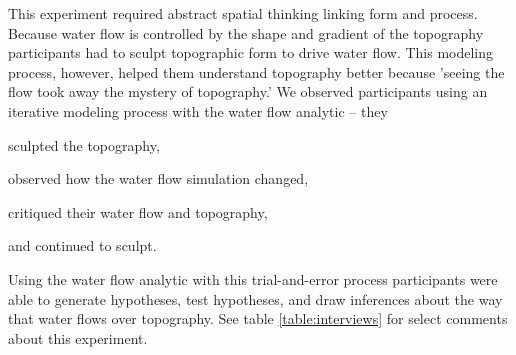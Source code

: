 \documentclass[prodmode,acmtochi]{acmsmall} %
\begin{document}
This experiment required abstract spatial thinking linking form and process. 
Because water flow is controlled by the shape and gradient of the topography
participants had to sculpt topographic form to drive water flow. 
This modeling process, however, helped them understand topography better 
because 'seeing the flow took away the mystery of topography.'
%
We observed participants using an iterative modeling process 
with the water flow analytic -- 
they 
\begin{enumerate*}[label=\alph*),font=\itshape]
\item sculpted the topography, 
\item observed how the water flow simulation changed, 
\item critiqued their water flow and topography, 
\item and continued to sculpt.
\end{enumerate*}
%
Using the water flow analytic with this trial-and-error process
participants were able to generate hypotheses, test hypotheses, and draw inferences 
about the way that water flows over topography. 
See table \ref{table:interviews} for select comments about this experiment.
%

\end{document}
